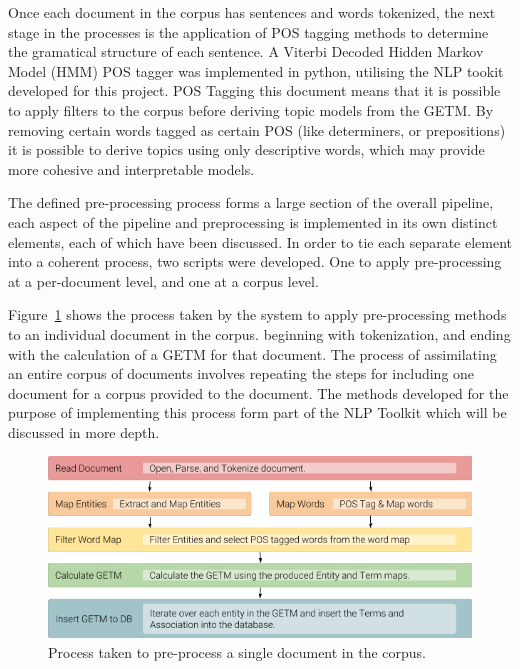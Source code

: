 \documentclass[10pt]{report}
\begin{document}
Once each document in the corpus has sentences and words tokenized, the next stage in the processes is the application of POS tagging methods to determine the gramatical structure of each sentence. A Viterbi Decoded Hidden Markov Model (HMM) POS tagger was implemented in python, utilising the NLP tookit developed for this project. POS Tagging this document means that it is possible to apply filters to the corpus before deriving topic models from the GETM. By removing certain words tagged as certain POS (like determiners, or prepositions) it is possible to derive topics using only descriptive words, which may provide more cohesive and interpretable models.

The defined pre-processing process forms a large section of the overall pipeline, each aspect of the pipeline and preprocessing is implemented in its own distinct elements, each of which have been discussed. In order to tie each separate element into a coherent process, two scripts were developed. One to apply pre-processing at a per-document level, and one at a corpus level.

Figure~\ref{fig:document_preprocess} shows the process taken by the system to apply pre-processing methods to an individual document in the corpus. beginning with tokenization, and ending with the calculation of a GETM for that document. The process of assimilating an entire corpus of documents involves repeating the steps for including one document for a corpus provided to the document. The methods developed for the purpose of implementing this process form part of the NLP Toolkit which will be discussed in more depth.

\begin{figure}[h!]
  \centering
  \includegraphics[scale=0.6]{per_document_process}
  \caption{Process taken to pre-process a single document in the corpus.\label{fig:document_preprocess}}
\end{figure}
\end{document}
